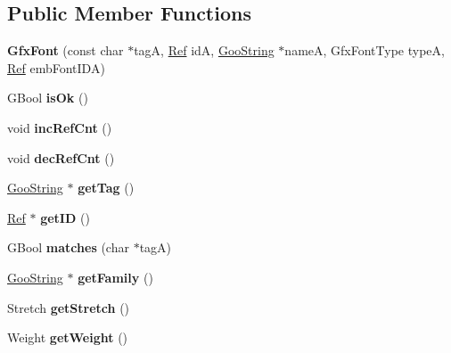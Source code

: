 \subsection*{Public Member Functions}
\begin{DoxyCompactItemize}
\item 
\mbox{\label{class_gfx_font_a204dbd38de23c9195b9f2db1e2db34c0}} 
{\bfseries Gfx\+Font} (const char $\ast$tagA, \hyperlink{struct_ref}{Ref} idA, \hyperlink{class_goo_string}{Goo\+String} $\ast$nameA, Gfx\+Font\+Type typeA, \hyperlink{struct_ref}{Ref} emb\+Font\+I\+DA)
\item 
\mbox{\label{class_gfx_font_a8e4f45efe3f76ad756f530f67e81dd46}} 
G\+Bool {\bfseries is\+Ok} ()
\item 
\mbox{\label{class_gfx_font_a26d293b7fc6f677e09c203ee94d58647}} 
void {\bfseries inc\+Ref\+Cnt} ()
\item 
\mbox{\label{class_gfx_font_a73026983e9f9b97d334d7df0e7bb5c49}} 
void {\bfseries dec\+Ref\+Cnt} ()
\item 
\mbox{\label{class_gfx_font_a6f59ea16d3279621da4004684da59a0d}} 
\hyperlink{class_goo_string}{Goo\+String} $\ast$ {\bfseries get\+Tag} ()
\item 
\mbox{\label{class_gfx_font_a44e5d2983d7569c50e39631b290af86a}} 
\hyperlink{struct_ref}{Ref} $\ast$ {\bfseries get\+ID} ()
\item 
\mbox{\label{class_gfx_font_a1a72ce6efdb597d08c80952f26164720}} 
G\+Bool {\bfseries matches} (char $\ast$tagA)
\item 
\mbox{\label{class_gfx_font_aedb21dda7584d104960e8e302e84f937}} 
\hyperlink{class_goo_string}{Goo\+String} $\ast$ {\bfseries get\+Family} ()
\item 
\mbox{\label{class_gfx_font_aefa6976c312cd9d8b295d1a6f84302ae}} 
Stretch {\bfseries get\+Stretch} ()
\item 
\mbox{\label{class_gfx_font_af8f9f8f96718148e5b52f508a6512d48}} 
Weight {\bfseries get\+Weight} ()

\end{DoxyCompactItemize}
